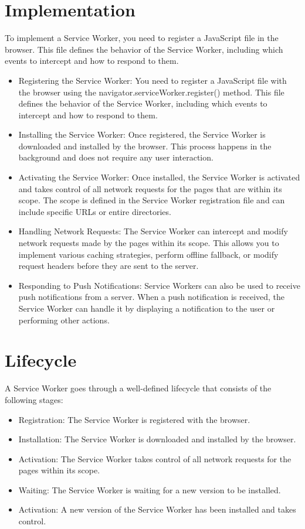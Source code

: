 \documentclass{report}
\begin{document}
\section{Implementation}\label{Implementation}

To implement a Service Worker, you need to register a JavaScript file in the browser. This file defines the behavior of the Service Worker, including which events to intercept and how to respond to them.\cite{mozilla23}
\begin{itemize}
    \item Registering the Service Worker: You need to register a JavaScript file with the browser using the navigator.serviceWorker.register() method. This file defines the behavior of the Service Worker, including which events to intercept and how to respond to them.
    \item Installing the Service Worker: Once registered, the Service Worker is downloaded and installed by the browser. This process happens in the background and does not require any user interaction.
    \item Activating the Service Worker: Once installed, the Service Worker is activated and takes control of all network requests for the pages that are within its scope. The scope is defined in the Service Worker registration file and can include specific URLs or entire directories.
    \item Handling Network Requests: The Service Worker can intercept and modify network requests made by the pages within its scope. This allows you to implement various caching strategies, perform offline fallback, or modify request headers before they are sent to the server.
    \item Responding to Push Notifications: Service Workers can also be used to receive push notifications from a server. When a push notification is received, the Service Worker can handle it by displaying a notification to the user or performing other actions.
\end{itemize}

\section{Lifecycle}\label{Lifecycle}

A Service Worker goes through a well-defined lifecycle that consists of the following stages:\cite{mozilla23}

\begin{itemize}
    \item Registration: The Service Worker is registered with the browser.
    \item Installation: The Service Worker is downloaded and installed by the browser.
    \item Activation: The Service Worker takes control of all network requests for the pages within its scope.
    \item Waiting: The Service Worker is waiting for a new version to be installed.
    \item Activation: A new version of the Service Worker has been installed and takes control.
\end{itemize}
\end{document}
